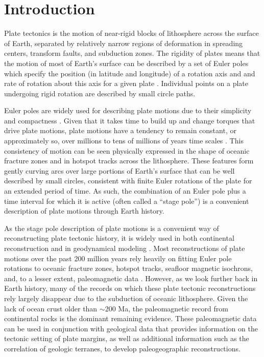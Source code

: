 \documentclass[11pt,letterpaper]{article}
\begin{document}

\section*{Introduction}

Plate tectonics is the motion of near-rigid blocks of lithosphere across the surface of Earth, separated by relatively narrow regions of deformation in spreading centers, transform faults, and subduction zones. The rigidity of plates means that the motion of most of Earth's surface can be described by a set of Euler poles which specify the position (in latitude and longitude) of a rotation axis and and rate of rotation about this axis for a given plate \citep[cf.][]{Cox2009a}. Individual points on a plate undergoing rigid rotation are described by small circle paths.

Euler poles are widely used for describing plate motions due to their simplicity and compactness \citep[e.g.][]{DeMets2010a, Argus2011a}. Given that it takes time to build up and change torques that drive plate motions, plate motions have a tendency to remain constant, or approximately so, over millions to tens of millions of years time scales \citep{Iaffaldano2012a}. This consistency of motion can be seen physically expressed in the shape of oceanic fracture zones and in hotspot tracks across the lithosphere. These features form gently curving arcs over large portions of Earth's surface that can be well described by small circles, consistent with finite Euler rotations of the plate for an extended period of time. As such, the combination of an Euler pole plus a time interval for which it is active (often called a ``stage pole'') is a convenient description of plate motions through Earth history.

As the stage pole description of plate motions is a convenient way of reconstructing plate tectonic history, it is widely used in both continental reconstruction \citep[e.g.][]{Boyden2011a} and in geodynamical modeling \citep[e.g.][]{Mcnamara2005a, Bull2014a}. Most reconstructions of plate motions over the past 200 million years rely heavily on fitting Euler pole rotations to oceanic fracture zones, hotspot tracks, seafloor magnetic isochrons, and, to a lesser extent, paleomagnetic data \citep{Muller1993a, Seton2012a}. However, as we look further back in Earth history, many of the records on which these plate tectonic reconstructions rely largely disappear due to the  subduction of oceanic lithosphere. Given the lack of ocean crust older than $\sim$200 Ma, the paleomagnetic record from continental rocks is the dominant remaining evidence. These paleomagnetic data can be used in conjunction with geological data that provides information on the tectonic setting of plate margins, as well as additional information such as the correlation of geologic terranes, to develop paleogeographic reconstructions.
\end{document}
